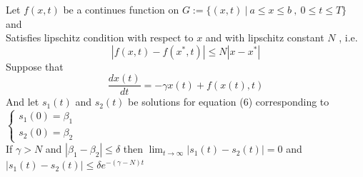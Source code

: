 \documentclass[]{article}
\begin{document}
\newpage
\begin{theorem}[]
    Let $f(x,t)$ be a continues function on $G:=\{(x,t) \ | \ a\leq x\leq b \ , \ 0\leq t \leq T\}$ and
    \\
    Satisfies lipschitz condition with respect to $x$ and with lipschitz constant $N$ , i.e.
    \[
        \left\lvert f(x,t) - f(x^*,t)\right\rvert \leq N \left\lvert x - x^*\right\rvert
    \]
    Suppose that
    \begin{equation}
        \frac{dx(t)}{dt} = -\gamma x(t) + f(x(t),t)
    \end{equation}
    And let $s_1(t)$ and $s_2(t)$ be solutions for equation (6) corresponding to
    $
        \begin{cases}
            s_1(0) = \beta_1
            \\
            s_2(0) = \beta_2
        \end{cases}
    $
    \\
    If $\gamma >N$ and $\left\lvert \beta_1 - \beta_2 \right\rvert \leq \delta $ then $\displaystyle \lim_{t \to \infty}|s_1(t) - s_2(t)| = 0 $
    and $|s_1(t) - s_2(t)| \leq \delta e^{-(\gamma-N)t}$
\end{theorem}
\end{document}
